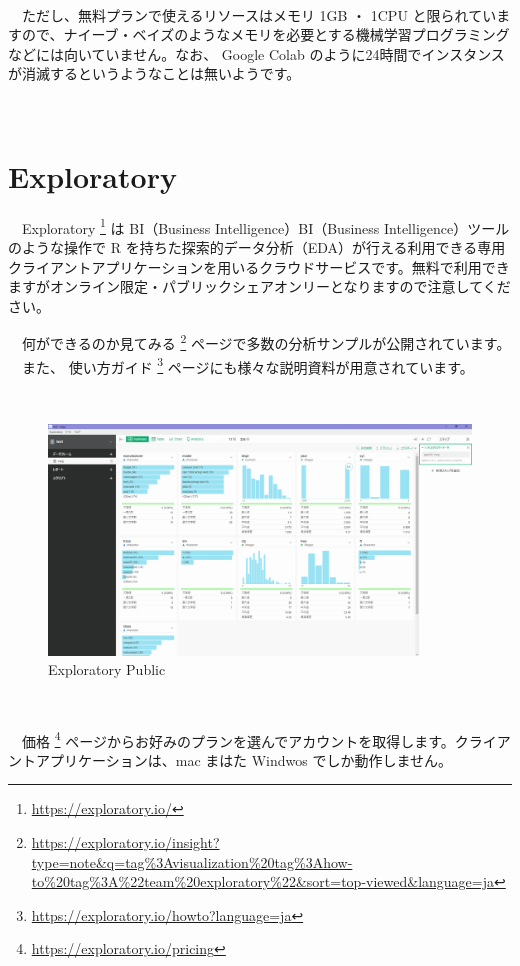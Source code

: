 \documentclass[
  12pt,
]{book}
\DeclareRobustCommand{\href}[2]{#2\footnote{\url{#1}}}
\begin{document}
　

　ただし、無料プランで使えるリソースはメモリ 1GB ・ 1CPU と限られていますので、ナイーブ・ベイズのようなメモリを必要とする機械学習プログラミングなどには向いていません。なお、 Google Colab のように24時間でインスタンスが消滅するというようなことは無いようです。

　

\hypertarget{exploratory}{%
\section{Exploratory}\label{exploratory}}

　\href{https://exploratory.io/}{Exploratory } は BI（Business Intelligence）BI（Business Intelligence）ツールのような操作で R を持ちた探索的データ分析（EDA）が行える利用できる専用クライアントアプリケーションを用いるクラウドサービスです。無料で利用できますがオンライン限定・パブリックシェアオンリーとなりますので注意してください。

　\href{https://exploratory.io/insight?type=note\&q=tag\%3Avisualization\%20tag\%3Ahow-to\%20tag\%3A\%22team\%20exploratory\%22\&sort=top-viewed\&language=ja}{何ができるのか見てみる } ページで多数の分析サンプルが公開されています。\\
　また、 \href{https://exploratory.io/howto?language=ja}{使い方ガイド } ページにも様々な説明資料が用意されています。

　\\

\begin{figure}[H]

{\centering \includegraphics[width=0.8\linewidth,]{fig/Exploratory} 

}

\caption{Exploratory Public}\label{fig:unnamed-chunk-89}
\end{figure}

　

　\href{https://exploratory.io/pricing}{価格 } ページからお好みのプランを選んでアカウントを取得します。クライアントアプリケーションは、mac まはた Windwos でしか動作しません。
\end{document}
